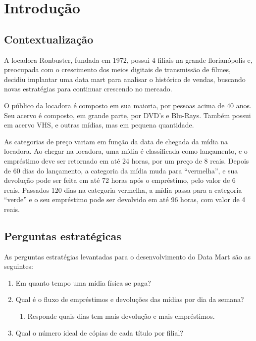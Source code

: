 
\chapter{Introdução}

\section{Contextualização}

A locadora Ronbuster, fundada em 1972, 
possui 4 filiais na grande florianópolis e, 
preocupada com o crescimento dos meios digitais 
de transmissão de filmes, decidiu implantar uma 
data mart para analisar o histórico de vendas, 
buscando novas estratégias para continuar 
crescendo no mercado.

O público da locadora é composto em sua maioria, 
por pessoas acima de 40 anos. Seu acervo é 
composto, em grande parte, por DVD’s e Blu-Rays. 
Também possui em acervo VHS, e outras mídias, 
mas em pequena quantidade.

As categorias de preço variam em função da data 
de chegada da mídia na locadora. Ao chegar na 
locadora, uma mídia é classificada como 
lançamento, e o empréstimo deve ser retornado 
em até 24 horas, por um preço de 8 reais. 
Depois de 60 dias do lançamento, a categoria 
da mídia muda para “vermelha”, e sua devolução 
pode ser feita em até 72 horas após o empréstimo, 
pelo valor de 6 reais. Passados 120 dias na 
categoria vermelha, a mídia passa para a 
categoria “verde” e o seu empréstimo pode ser 
devolvido em até 96 horas, com valor de 4 reais.
 
\section{Perguntas estratégicas}

As perguntas estratégias levantadas para o 
desenvolvimento do Data Mart são as seguintes:

\begin{enumerate}
    \item Em quanto tempo uma mídia física se paga?
    \item Qual é o fluxo de empréstimos e devoluções das mídias por dia da semana?    
    \begin{enumerate}
    \item Responde quais dias tem mais devolução e mais empréstimos.
    \end{enumerate}
    \item Qual o número ideal de cópias de cada título por filial?
    \end{enumerate}
  


